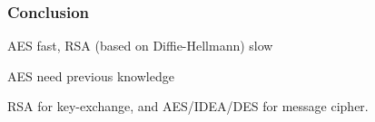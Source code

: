\subsubsection{Conclusion}
\begin{liste}
\item AES fast, RSA (based on Diffie-Hellmann) slow
\item AES need previous knowledge 
\item RSA for key-exchange, and AES/IDEA/DES for message cipher.
\end{liste}
